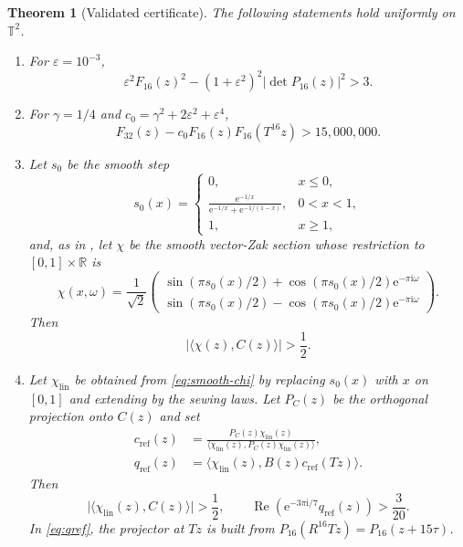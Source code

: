 \documentclass[11pt,reqno]{amsart}
\numberwithin{equation}{section}
\newtheorem{theorem}{Theorem}[section]
\theoremstyle{definition}
\newcommand{\R}{\mathbb R}
\newcommand{\T}{\mathbb T}
\newcommand{\ip}[2]{\langle #1,#2\rangle}
\newcommand{\abs}[1]{\lvert #1\rvert}
\newcommand{\e}{\mathrm e}
\newcommand{\ii}{\mathrm i}
\begin{document}
\begin{theorem}[Validated certificate]\label{thm:validated-certificate}
The following statements hold uniformly on $\T^2$.
\begin{enumerate}[label=\textup{(C\arabic*)},leftmargin=2.4em]
\item\label{cert:gap}
For $\varepsilon=10^{-3}$,
\[
 \varepsilon^2F_{16}(z)^2-(1+\varepsilon^2)^2
       \abs{\det P_{16}(z)}^2>3.
\]
\item\label{cert:junction}
For $\gamma=1/4$ and
$c_0=\gamma^2+2\varepsilon^2+\varepsilon^4$,
\[
 F_{32}(z)-c_0F_{16}(z)F_{16}(T^{16}z)>15{,}000{,}000.
\]
\item\label{cert:smooth-overlap}
Let $s_0$ be the smooth step
\[
 s_0(x)=
 \begin{cases}
 0,&x\le0,\\
 \displaystyle\frac{\e^{-1/x}}
 {\e^{-1/x}+\e^{-1/(1-x)}},&0<x<1,\\
 1,&x\ge1,
 \end{cases}
\]
and, as in \cite[\S3.3]{FPPV2026}, let $\chi$ be the smooth vector-Zak
section whose restriction to
$[0,1]\times\R$ is
\begin{equation}\label{eq:smooth-chi}
 \chi(x,\omega)=\frac1{\sqrt2}
 \begin{pmatrix}
  \sin(\pi s_0(x)/2)+\cos(\pi s_0(x)/2)\e^{-\pi\ii\omega}\\
  \sin(\pi s_0(x)/2)-\cos(\pi s_0(x)/2)\e^{-\pi\ii\omega}
 \end{pmatrix}.
\end{equation}
Then
\[
 \abs{\ip{\chi(z)}{C(z)}}>\frac12.
\]
\item\label{cert:linear-gauge}
Let $\chi_{\mathrm{lin}}$ be obtained from \eqref{eq:smooth-chi} by replacing
$s_0(x)$ with $x$ on $[0,1]$ and extending by the sewing laws.  Let $P_C(z)$
be the orthogonal projection onto $C(z)$ and set
\begin{align}
 c_{\mathrm{ref}}(z)&=
 \frac{P_C(z)\chi_{\mathrm{lin}}(z)}
 {\ip{\chi_{\mathrm{lin}}(z)}{P_C(z)\chi_{\mathrm{lin}}(z)}},
 \label{eq:cref}\\
 q_{\mathrm{ref}}(z)&=
 \ip{\chi_{\mathrm{lin}}(z)}
 {B(z)c_{\mathrm{ref}}(Tz)}.
 \label{eq:qref}
\end{align}
Then
\begin{equation}\label{eq:linear-cert}
 \abs{\ip{\chi_{\mathrm{lin}}(z)}{C(z)}}>\frac12,\qquad
 \operatorname{Re}\!\left(\e^{-3\pi\ii/7}q_{\mathrm{ref}}(z)\right)
 >\frac3{20}.
\end{equation}
In \eqref{eq:qref}, the projector at $Tz$ is built from
$P_{16}(R^{16}Tz)=P_{16}(z+15\tau)$.
\end{enumerate}
\end{theorem}
\end{document}
